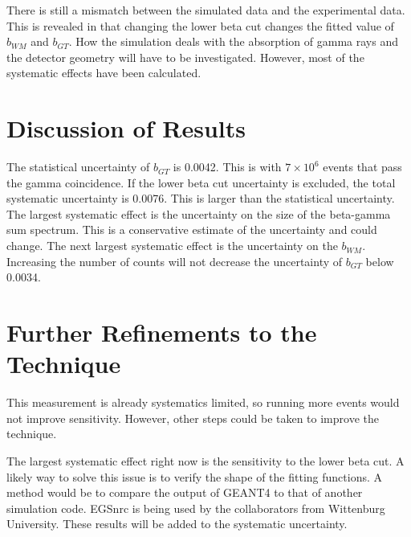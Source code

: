 \documentclass[../MaxHughesThesis.tex]{subfiles}
\begin{document}
There is still a mismatch between the simulated data and the experimental data.
This is revealed in that changing the lower beta cut changes the fitted value of $b_{WM}$ and $b_{GT}$.
How the simulation deals with the absorption of gamma rays and the detector geometry will have to be investigated.
However, most of the systematic effects have been calculated.

\section{Discussion of Results}

The statistical uncertainty of $b_{GT}$ is 0.0042.
This is with $7 \times 10^{6}$ events that pass the gamma coincidence.
If the lower beta cut uncertainty is excluded, the total systematic uncertainty is 0.0076.
This is larger than the statistical uncertainty.
The largest systematic effect is the uncertainty on the size of the beta-gamma sum spectrum.
This is a conservative estimate of the uncertainty and could change.
The next largest systematic effect is the uncertainty on the $b_{WM}$.
Increasing the number of counts will not decrease the uncertainty of $b_{GT}$ below 0.0034.


\section{Further Refinements to the Technique}
This measurement is already systematics limited, so running more events would not improve sensitivity.
However, other steps could be taken to improve the technique.

The largest systematic effect right now is the sensitivity to the lower beta cut. 
A likely way to solve this issue is to verify the shape of the fitting functions. 
A method would be to compare the output of GEANT4 to that of another simulation code.
EGSnrc is being used by the collaborators from Wittenburg University. 
These results will be added to the systematic uncertainty.
\end{document}
